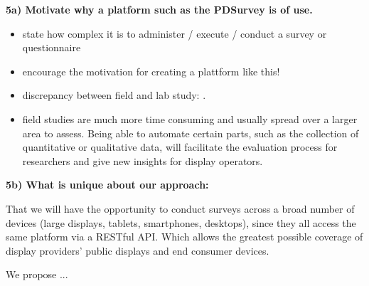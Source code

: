 

	\textbf{5a) Motivate why a platform such as the PDSurvey is of use. }

		\begin{itemize}[itemsep=0pt] 
		\item state how complex it is to administer / execute / conduct a survey or questionnaire
		\item encourage the motivation for creating a plattform like this!
		\item discrepancy between field and lab study: \cite{Ojala2011}.
		\item field studies are much more time consuming and usually spread over a larger area to assess. Being able to automate certain parts, such as the collection of quantitative or qualitative data, will facilitate the evaluation process for researchers and give new insights for display operators.
		\end{itemize}

	\textbf{5b) What is unique about our approach:}

		That we will have the opportunity to conduct surveys across a broad number of devices (large displays, tablets, smartphones, desktops), since they all access the same platform via a RESTful API. Which allows the greatest possible coverage of display providers' public displays and end consumer devices.

		We propose ...





